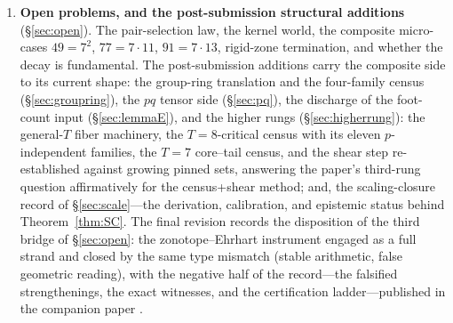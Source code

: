 \documentclass[11pt,a4paper]{article}
\numberwithin{equation}{section}
\theoremstyle{plain}
\theoremstyle{plain}
\theoremstyle{definition}
\theoremstyle{remark}
\begin{document}
\begin{enumerate}[leftmargin=1.6em,itemsep=2pt]
inequality Hq and the volume law H1g restated. The instrument is the
census in different notation; it consumes the hypotheses it was
commissioned to prove. That is the mechanism behind the type mismatch:
losslessness forbids generated decay, and the reformulation is bounded
by its own fidelity. (The closure theorem covers automata built on the
cascade's bijective drift---the lossless state space; instruments that
do not inherit the drift are outside its scope, as
\S\ref{sec:scale-status} records.)
\item \textbf{Open problems, and the post-submission structural
  additions} (\S\ref{sec:open}). The pair-selection law, the kernel world,
  the composite micro-cases $49=7^2$, $77=7\cdot 11$, $91=7\cdot 13$,
  rigid-zone termination, and whether the decay is fundamental. The
  post-submission additions carry the composite side to its current
  shape: the group-ring translation and the four-family census
  (\S\ref{sec:groupring}), the $pq$ tensor side (\S\ref{sec:pq}), the
  discharge of the foot-count input (\S\ref{sec:lemmaE}), and the higher
  rungs (\S\ref{sec:higherrung}): the
  general-$T$ fiber machinery, the $T=8$-critical census with its eleven
  $p$-independent families, the $T=7$ core--tail census, and the shear
  step re-established against growing pinned sets, answering the paper's
  third-rung question affirmatively for the census+shear method; and,
  the scaling-closure record of
  \S\ref{sec:scale}---the derivation, calibration, and epistemic status
  behind Theorem~\ref{thm:SC}. The final revision records the disposition
  of the third bridge of \S\ref{sec:open}: the zonotope--Ehrhart
  instrument engaged as a full strand and closed by the same type
  mismatch (stable arithmetic, false geometric reading), with the
  negative half of the record---the falsified strengthenings, the exact
  witnesses, and the certification ladder---published in the companion
  paper \cite{companion-paper}.
\end{enumerate}
\end{document}
